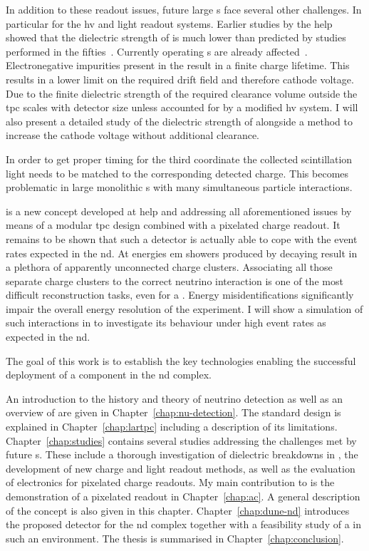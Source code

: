 In addition to these readout issues, future large \lartpc{}s face several other challenges.
In particular for the \gls{hv} and light readout systems.
Earlier studies by the \gls{help}~\cite{breakdown_14} showed that the dielectric strength of \lar{} is much lower than predicted by studies performed in the fifties~\cite{swan1, swan2}.
Currently operating \lartpc{}s are already affected~\cite{uboone}.
Electronegative impurities present in the \lar{} result in a finite charge lifetime.
This results in a lower limit on the required drift field and therefore cathode voltage.
Due to the finite dielectric strength of \lar{} the required clearance volume outside the \gls{tpc} scales with detector size unless accounted for by a modified \gls{hv} system.
I will also present a detailed study of the dielectric strength of \lar{} alongside a method to increase the cathode voltage without additional clearance.

In order to get proper timing for the third coordinate the collected scintillation light needs to be matched to the corresponding detected charge.
This becomes problematic in large monolithic \lartpc{}s with many simultaneous particle interactions.

\AC{} is a new \lartpc{} concept developed at \gls{help} and addressing all aforementioned issues by means of a modular \gls{tpc} design combined with a pixelated charge readout.
It remains to be shown that such a detector is actually able to cope with the event rates expected in the \dune{} \gls{nd}.
At \dune{} energies \gls{em} showers produced by decaying \Pgpz result in a plethora of apparently unconnected charge clusters.
Associating all those separate charge clusters to the correct neutrino interaction is one of the most difficult reconstruction tasks, even for a \lartpc{}.
Energy misidentifications significantly impair the overall energy resolution of the experiment.
I will show a simulation of such interactions in \AC{} to investigate its behaviour under high event rates as expected in the \dune{} \gls{nd}.

The goal of this work is to establish the key technologies enabling the successful deployment of a \lartpc{} component in the \dune{} \gls{nd} complex.

An introduction to the history and theory of neutrino detection as well as an overview of \dune{} are given in Chapter~\ref{chap:nu-detection}.
The standard \lartpc{} design is explained in Chapter~\ref{chap:lartpc} including a description of its limitations.
Chapter~\ref{chap:studies} contains several studies addressing the challenges met by future \lartpc{}s.
These include a thorough investigation of dielectric breakdowns in \lar{}, the development of new charge and light readout methods, as well as the evaluation of electronics for pixelated charge readouts.
My main contribution to \AC{} is the demonstration of a pixelated \lartpc{} readout in Chapter~\ref{chap:ac}.
A general description of the \AC{} concept is also given in this chapter.
Chapter~\ref{chap:dune-nd} introduces the proposed \AC{} detector for the \dune{} \gls{nd} complex together with a feasibility study of a \lartpc{} in such an environment.
The thesis is summarised in Chapter~\ref{chap:conclusion}.
